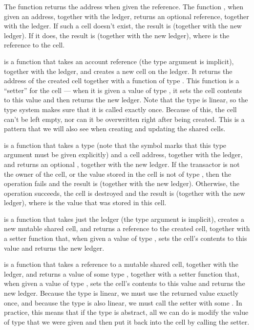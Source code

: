 The function  returns the address when given the reference. The function , when given an address, together with the ledger, returns an optional reference, together with the ledger. If such a cell doesn't exist, the result is  (together with the new ledger). If it does, the result is  (together with the new ledger), where  is the reference to the cell.



 is a function that takes an account reference (the type argument is implicit), together with the ledger, and creates a new cell on the ledger. It returns the address of the created cell together with a function of type . This function is a ``setter'' for the cell --- when it is given a value of type , it sets the cell contents to this value and then returns the new ledger. Note that the type  is linear, so the type system makes sure that it is called exactly once. Because of this, the cell can't be left empty, nor can it be overwritten right after being created. This is a pattern that we will also see when creating and updating the shared cells.



 is a function that takes a type  (note that the symbol  marks that this type argument must be given explicitly) and a cell address, together with the ledger, and returns an optional , together with the new ledger. If the transactor is not the owner of the cell, or the value stored in the cell is not of type , then the operation fails and the result is  (together with the new ledger). Otherwise, the operation succeeds, the cell is destroyed and the result is  (together with the new ledger), where  is the value that was stored in this cell.



 is a function that takes just the ledger (the type argument is implicit), creates a new mutable shared cell, and returns a reference to the created cell, together with a setter function that, when given a value of type , sets the cell's contents to this value and returns the new ledger.



 is a function that takes a reference to a mutable shared cell, together with the ledger, and returns a value of some type , together with a setter function that, when given a value of type , sets the cell's contents to this value and returns the new ledger. Because the type  is linear, we must use the returned value exactly once, and because the type  is also linear, we must call the setter with some . In practice, this means that if the type  is abstract, all we can do is modify the value of type  that we were given and then put it back into the cell by calling the setter.

